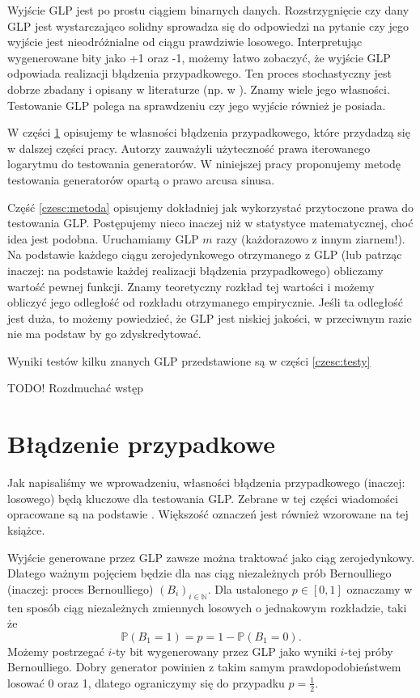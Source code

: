\documentclass[a4paper,11pt,oneside]{book}
\newcommand{\Prob}{\mathbb{P}}
\theoremstyle{definition}
\begin{document}
Wyjście GLP jest po prostu ciągiem binarnych danych. Rozstrzygnięcie czy dany GLP jest wystarczająco solidny sprowadza się do odpowiedzi na pytanie czy jego wyjście jest nieodróżnialne od ciągu prawdziwie losowego. Interpretując wygenerowane bity jako +1 oraz -1, możemy łatwo zobaczyć, że wyjście GLP odpowiada realizacji błądzenia przypadkowego. Ten proces stochastyczny jest dobrze zbadany i opisany w literaturze (np. w \cite{feller}). Znamy wiele jego własności. Testowanie GLP polega na sprawdzeniu czy jego wyjście również je posiada.

W części \ref{czesc:bladzenie} opisujemy te własności błądzenia przypadkowego, które przydadzą się w dalszej części pracy. Autorzy \cite{wang-nic} zauważyli użyteczność prawa iterowanego logarytmu do testowania generatorów. W niniejszej pracy proponujemy metodę testowania generatorów opartą o prawo arcusa sinusa.

Część \ref{czesc:metoda} opisujemy dokładniej jak wykorzystać przytoczone prawa do testowania GLP. Postępujemy nieco inaczej niż w statystyce matematycznej, choć idea jest podobna. Uruchamiamy GLP $m$ razy (każdorazowo z innym ziarnem!). Na podstawie każdego ciągu zerojedynkowego otrzymanego z GLP (lub patrząc inaczej: na podstawie każdej realizacji błądzenia przypadkowego) obliczamy wartość pewnej funkcji. Znamy teoretyczny rozkład tej wartości i możemy obliczyć jego odległość od rozkładu otrzymanego empirycznie. Jeśli ta odległość jest duża, to możemy powiedzieć, że GLP jest niskiej jakości, w przeciwnym razie nie ma podstaw by go zdyskredytować.

Wyniki testów kilku znanych GLP przedstawione są w części \ref{czesc:testy}

{\bigskip \color{red} \LARGE{TODO!} Rozdmuchać wstęp}


\chapter{Błądzenie przypadkowe}
\label{czesc:bladzenie}

Jak napisaliśmy we wprowadzeniu, własności błądzenia przypadkowego (inaczej: losowego) będą kluczowe dla testowania GLP. Zebrane w tej części wiadomości opracowane są na podstawie \cite{feller}. Większość oznaczeń jest również wzorowane na tej książce.

Wyjście generowane przez GLP zawsze można traktować jako ciąg zerojedynkowy. Dlatego ważnym pojęciem będzie dla nas ciąg niezależnych prób Bernoulliego (inaczej: proces Bernoulliego) $(B_i)_{i \in \mathbb{N}}$. Dla ustalonego $p \in [0,1]$ oznaczamy w ten sposób ciąg niezależnych zmiennych losowych o jednakowym rozkładzie, taki że
\[ \Prob(B_1 = 1) = p = 1 - \Prob(B_1 = 0). \]
Możemy postrzegać $i$-ty bit wygenerowany przez GLP jako wyniki $i$-tej próby Bernoulliego. Dobry generator powinien z takim samym prawdopodobieństwem losować 0 oraz 1, dlatego ograniczymy się do przypadku $p = \frac{1}{2}$.
\end{document}
